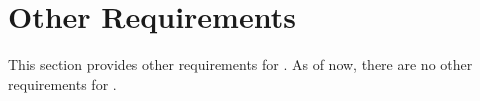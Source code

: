 \KNEADSECTIONNEWPAGE
\section{Other Requirements}
\label{lab:sec_OtherRequirements}
% 

This section provides other requirements for \ThisSys. As of now, there are no other requirements for \ThisSys.

% 

% 